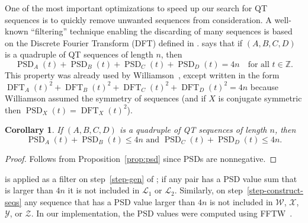\documentclass[12pt]{article}
\numberwithin{equation}{section}
\newtheorem{corollary}[theorem]{Corollary}
\DeclareMathOperator{\PSD}{PSD}
\DeclareMathOperator{\DFT}{DFT}
\newcommand{\cL}{{\mathcal L}}
\begin{document}
One of the most important optimizations to speed up our search for QT sequences is to quickly remove unwanted sequences from consideration.  A well-known ``filtering''
technique enabling the discarding of many sequences is based on the Discrete Fourier Transform (DFT)
defined in .
 says that if $(A, B, C, D)$ is a quadruple of QT sequences of length $n$, then
\[ \PSD_A(t) + \PSD_B(t) + \PSD_C(t) + \PSD_D(t) = 4n \quad\text{for all $t\in\mathbb{Z}$}. \]
This property was already used by Williamson~\cite[eq.~14]{Williamson1944}, except
written in the form $\DFT_A(t)^2+\DFT_B(t)^2+\DFT_C(t)^2+\DFT_D(t)^2=4n$ because Williamson
assumed the symmetry of sequences (and if $X$ is conjugate symmetric then $\PSD_X(t)=\DFT_X(t)^2$).
\begin{corollary}\label{cor:PSD}
If\/ $(A, B, C, D)$ is a quadruple of QT sequences of length $n$, then
\[ \PSD_A(t)+\PSD_B(t) \leq 4n \text{ and } \PSD_C(t)+\PSD_D(t) \leq 4n . \]
\end{corollary}
\begin{proof}
Follows from Proposition~\ref{prop:psd} since PSDs are nonnegative.
\end{proof}

 is applied as a filter on step~\ref{step-gen} of ; if any pair
has a PSD value sum that is larger than $4n$ it is not included in $\cL_1$ or $\cL_2$.
Similarly, on step~\ref{step-construct-seqs} any sequence that has a PSD value larger than $4n$
is not included in $\mathcal W$, $\mathcal X$, $\mathcal Y$, or $\mathcal Z$.
In our implementation, the PSD values were computed using FFTW~\cite{Frigo2005}.
\end{document}
